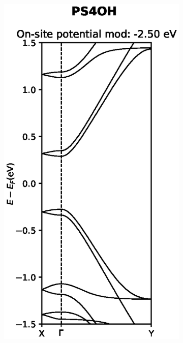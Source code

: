 \begin{figure}[h]
\begin{subfigure}[b]{0.23\textwidth}
    \label{PS4OHremove}
    \end{subfigure}
    ~
    \begin{subfigure}[b]{0.23\textwidth}
    \centering
    \includegraphics[width=\textwidth]{Figures/PS4OHmod1.eps}
    \label{PS4OHmod1}
    \end{subfigure}
    ~
    \begin{subfigure}[b]{0.23\textwidth}

\end{subfigure}
\end{figure}
